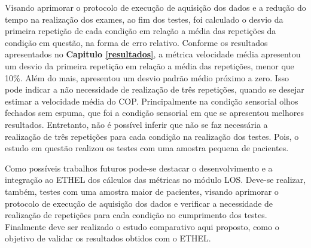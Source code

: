 Visando aprimorar o protocolo de execução de aquisição dos dados e a redução do tempo na realização dos exames, ao fim dos testes, foi calculado o desvio da primeira repetição de cada condição em relação a média das repetições da condição em questão, na forma de erro relativo. Conforme os resultados apresentados no \textbf{\textbf{Capitulo} \ref{resultados}}, a métrica velocidade média apresentou um desvio da primeira repetição em relação a média das repetições, menor que 10\%. Além do mais, apresentou um desvio padrão médio próximo a zero. Isso pode indicar a não necessidade de realização de três repetições, quando se desejar estimar a velocidade média do COP. Principalmente na condição sensorial olhos fechados sem espuma, que foi a condição sensorial em que se apresentou melhores resultados. Entretanto, não é possível inferir que não se faz necessária a realização de três repetições para cada condição na realização dos testes. Pois, o estudo em questão realizou os testes com uma amostra pequena de pacientes. 


Como possíveis trabalhos futuros pode-se destacar o desenvolvimento e a integração ao ETHEL dos cálculos das métricas no módulo LOS. Deve-se realizar, também, testes com uma amostra maior de pacientes, visando aprimorar o protocolo de execução de aquisição dos dados e verificar a necessidade de realização de repetições para cada condição no cumprimento dos testes. Finalmente deve ser  realizado o estudo comparativo aqui proposto, como o objetivo de validar os resultados obtidos com o ETHEL. 
  


